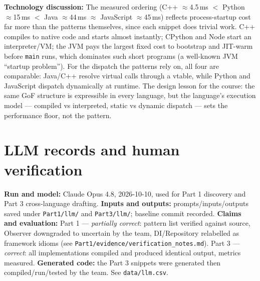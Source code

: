 \documentclass[11pt,a4paper]{article}
\begin{document}
\textbf{Technology discussion:} The measured ordering (C++ $\approx$4.5\,ms $<$ Python $\approx$15\,ms $<$ Java $\approx$44\,ms $\approx$ JavaScript $\approx$45\,ms) reflects process-startup cost far more than the patterns themselves, since each snippet does trivial work. C++ compiles to native code and starts almost instantly; CPython and Node start an interpreter/VM; the JVM pays the largest fixed cost to bootstrap and JIT-warm before \texttt{main} runs, which dominates such short programs (a well-known JVM ``startup problem''). For the dispatch the patterns rely on, all four are comparable: Java/C++ resolve virtual calls through a vtable, while Python and JavaScript dispatch dynamically at runtime. The design lesson for the course: the same GoF structure is expressible in every language, but the language's execution model --- compiled vs interpreted, static vs dynamic dispatch --- sets the performance floor, not the pattern.\par

\section{LLM records and human verification}
\textbf{Run and model:} Claude Opus 4.8, 2026-10-10, used for Part 1 discovery and Part 3 cross-language drafting. \textbf{Inputs and outputs:} prompts/inputs/outputs saved under \texttt{Part1/llm/} and \texttt{Part3/llm/}; baseline commit recorded. \textbf{Claims and evaluation:} Part 1 --- \emph{partially correct}: pattern list verified against source, Observer downgraded to uncertain by the team, DI/Repository relabelled as framework idioms (see \texttt{Part1/evidence/verification\_notes.md}). Part 3 --- \emph{correct}: all implementations compiled and produced identical output, metrics measured. \textbf{Generated code:} the Part 3 snippets were generated then compiled/run/tested by the team. See \texttt{data/llm.csv}.\par
\end{document}
